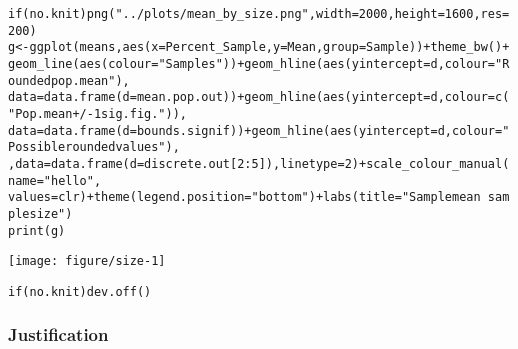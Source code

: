 \documentclass{article}\usepackage[]{graphicx}\usepackage[]{color}
\makeatletter
\def\maxwidth{ %
  \ifdim\Gin@nat@width>\linewidth
    \linewidth
  \else
    \Gin@nat@width
  \fi
}
\newcommand{\hlnum}[1]{\textcolor[rgb]{0.863,0.196,0.184}{#1}}%
\newcommand{\hlstr}[1]{\textcolor[rgb]{0.863,0.196,0.184}{#1}}%
\newcommand{\hlopt}[1]{\textcolor[rgb]{0.576,0.631,0.631}{#1}}%
\newcommand{\hlstd}[1]{\textcolor[rgb]{0.514,0.58,0.588}{#1}}%
\newcommand{\hlkwa}[1]{\textcolor[rgb]{0.796,0.294,0.086}{#1}}%
\newcommand{\hlkwb}[1]{\textcolor[rgb]{0.522,0.6,0}{#1}}%
\newcommand{\hlkwc}[1]{\textcolor[rgb]{0.796,0.294,0.086}{#1}}%
\newcommand{\hlkwd}[1]{\textcolor[rgb]{0.576,0.631,0.631}{#1}}%
\newenvironment{kframe}{%
 \def\at@end@of@kframe{}%
 \ifinner\ifhmode%
  \def\at@end@of@kframe{\end{minipage}}%
  \begin{minipage}{\columnwidth}%
 \fi\fi%
 \def\FrameCommand##1{\hskip\@totalleftmargin \hskip-\fboxsep
 \colorbox{shadecolor}{##1}\hskip-\fboxsep
     \hskip-\linewidth \hskip-\@totalleftmargin \hskip\columnwidth}%
 \MakeFramed {\advance\hsize-\width
   \@totalleftmargin\z@ \linewidth\hsize
   \@setminipage}}%
 {\par\unskip\endMakeFramed%
 \at@end@of@kframe}
\newenvironment{knitrout}{}{} %
\makeatother
\begin{document}
\begin{knitrout}
\color{fgcolor}\begin{kframe}
\begin{alltt}
\hlkwa{if} \hlstd{(no.knit)} \hlkwd{png}\hlstd{(}\hlstr{"../plots/mean_by_size.png"}\hlstd{,} \hlkwc{width} \hlstd{=} \hlnum{2000}\hlstd{,} \hlkwc{height} \hlstd{=} \hlnum{1600}\hlstd{,} \hlkwc{res} \hlstd{=} \hlnum{200}\hlstd{)}
\hlstd{g} \hlkwb{<-} \hlkwd{ggplot}\hlstd{(means,} \hlkwd{aes}\hlstd{(}\hlkwc{x} \hlstd{= Percent_Sample,} \hlkwc{y} \hlstd{= Mean,} \hlkwc{group} \hlstd{= Sample))} \hlopt{+} \hlkwd{theme_bw}\hlstd{()} \hlopt{+}
    \hlkwd{geom_line}\hlstd{(}\hlkwd{aes}\hlstd{(}\hlkwc{colour} \hlstd{=} \hlstr{"Samples"}\hlstd{))} \hlopt{+} \hlkwd{geom_hline}\hlstd{(}\hlkwd{aes}\hlstd{(}\hlkwc{yintercept} \hlstd{= d,} \hlkwc{colour} \hlstd{=} \hlstr{"Rounded pop. mean"}\hlstd{),}
    \hlkwc{data} \hlstd{=} \hlkwd{data.frame}\hlstd{(}\hlkwc{d} \hlstd{= mean.pop.out))} \hlopt{+} \hlkwd{geom_hline}\hlstd{(}\hlkwd{aes}\hlstd{(}\hlkwc{yintercept} \hlstd{= d,} \hlkwc{colour} \hlstd{=} \hlkwd{c}\hlstd{(}\hlstr{"Pop. mean +/- 1 sig. fig."}\hlstd{)),}
    \hlkwc{data} \hlstd{=} \hlkwd{data.frame}\hlstd{(}\hlkwc{d} \hlstd{= bounds.signif))} \hlopt{+} \hlkwd{geom_hline}\hlstd{(}\hlkwd{aes}\hlstd{(}\hlkwc{yintercept} \hlstd{= d,} \hlkwc{colour} \hlstd{=} \hlstr{"Possible rounded values"}\hlstd{),}
    \hlstd{,} \hlkwc{data} \hlstd{=} \hlkwd{data.frame}\hlstd{(}\hlkwc{d} \hlstd{= discrete.out[}\hlnum{2}\hlopt{:}\hlnum{5}\hlstd{]),} \hlkwc{linetype} \hlstd{=} \hlnum{2}\hlstd{)} \hlopt{+} \hlkwd{scale_colour_manual}\hlstd{(}\hlkwc{name} \hlstd{=} \hlstr{"hello"}\hlstd{,}
    \hlkwc{values} \hlstd{= clr)} \hlopt{+} \hlkwd{theme}\hlstd{(}\hlkwc{legend.position} \hlstd{=} \hlstr{"bottom"}\hlstd{)} \hlopt{+} \hlkwd{labs}\hlstd{(}\hlkwc{title} \hlstd{=} \hlstr{"Sample mean ~ sample size"}\hlstd{)}
\hlkwd{print}\hlstd{(g)}
\end{alltt}
\end{kframe}
\texttt{[image: figure/size-1]} 
\begin{kframe}\begin{alltt}
\hlkwa{if} \hlstd{(no.knit)} \hlkwd{dev.off}\hlstd{()}
\end{alltt}
\end{kframe}
\end{knitrout}

\subsubsection{Justification}
\end{document}
